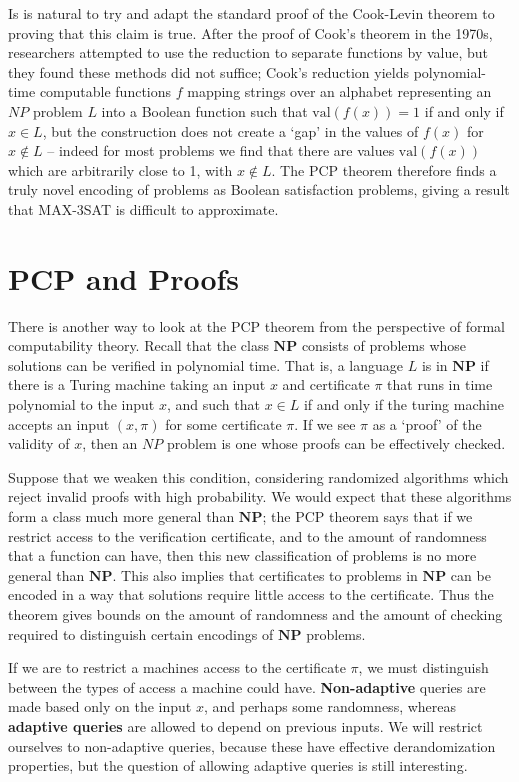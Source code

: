 Is is natural to try and adapt the standard proof of the Cook-Levin theorem to proving that this claim is true. After the proof of Cook's theorem in the 1970s, researchers attempted to use the reduction to separate functions by value, but they found these methods did not suffice; Cook's reduction yields polynomial-time computable functions $f$ mapping strings over an alphabet representing an $NP$ problem $L$ into a Boolean function such that $\text{val}(f(x)) = 1$ if and only if $x \in L$, but the construction does not create a `gap' in the values of $f(x)$ for $x \not \in L$ -- indeed for most problems we find that there are values $\text{val}(f(x))$ which are arbitrarily close to 1, with $x \not \in L$. The PCP theorem therefore finds a truly novel encoding of problems as Boolean satisfaction problems, giving a result that MAX-3SAT is difficult to approximate.

\section{PCP and Proofs}

There is another way to look at the PCP theorem from the perspective of formal computability theory. Recall that the class $\mathbf{NP}$ consists of problems whose solutions can be verified in polynomial time. That is, a language $L$ is in $\mathbf{NP}$ if there is a Turing machine taking an input $x$ and certificate $\pi$ that runs in time polynomial to the input $x$, and such that $x \in L$ if and only if the turing machine accepts an input $(x, \pi)$ for some certificate $\pi$. If we see $\pi$ as a `proof' of the validity of $x$, then an $NP$ problem is one whose proofs can be effectively checked.

Suppose that we weaken this condition, considering randomized algorithms which reject invalid proofs with high probability. We would expect that these algorithms form a class much more general than $\mathbf{NP}$; the PCP theorem says that if we restrict access to the verification certificate, and to the amount of randomness that a function can have, then this new classification of problems is no more general than $\mathbf{NP}$. This also implies that certificates to problems in $\mathbf{NP}$ can be encoded in a way that solutions require little access to the certificate. Thus the theorem gives bounds on the amount of randomness and the amount of checking required to distinguish certain encodings of $\mathbf{NP}$ problems.

If we are to restrict a machines access to the certificate $\pi$, we must distinguish between the types of access a machine could have. {\bf Non-adaptive} queries are made based only on the input $x$, and perhaps some randomness, whereas {\bf adaptive queries} are allowed to depend on previous inputs. We will restrict ourselves to non-adaptive queries, because these have effective derandomization properties, but the question of allowing adaptive queries is still interesting.

